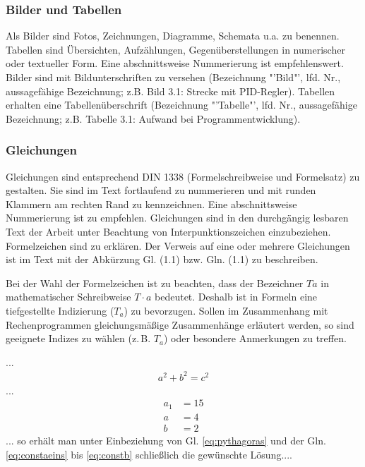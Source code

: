 \subsubsection{Bilder und Tabellen}
\label{sec:BilderUndTabellen}

Als Bilder sind Fotos, Zeichnungen, Diagramme, Schemata u.a. zu benennen. Tabellen sind Übersichten, Aufzählungen, Gegenüberstellungen in numerischer oder textueller Form. Eine abschnittsweise Nummerierung ist empfehlenswert.
Bilder sind mit Bildunterschriften zu versehen (Bezeichnung "'Bild"', lfd. Nr., aussagefähige Bezeichnung; z.B. Bild 3.1: Strecke mit PID-Regler).
Tabellen erhalten eine Tabellenüberschrift (Bezeichnung "'Tabelle"', lfd. Nr., aussagefähige Bezeichnung; z.B. Tabelle 3.1: Aufwand bei Programmentwicklung).


\subsubsection{Gleichungen}
\label{sec:Gleichungen}

Gleichungen sind entsprechend DIN 1338 (Formelschreibweise und Formelsatz) zu gestalten. Sie sind im Text fortlaufend zu nummerieren und mit runden Klammern am rechten Rand zu kennzeichnen. Eine abschnittsweise Nummerierung ist zu empfehlen. Gleichungen sind in den durchgängig lesbaren Text der Arbeit unter Beachtung von Interpunktionszeichen einzubeziehen. Formelzeichen sind zu erklären. Der Verweis auf eine oder mehrere Gleichungen ist im Text mit der Abkürzung Gl. (1.1) bzw. Gln. (1.1) zu beschreiben.

Bei der Wahl der Formelzeichen ist zu beachten, dass der Bezeichner $Ta$ in mathematischer Schreibweise $T \cdot a$ bedeutet. Deshalb ist in Formeln eine tiefgestellte Indizierung ($T_a$) zu bevorzugen. Sollen im Zusammenhang mit Rechenprogrammen gleichungsmäßige Zusammenhänge erläutert werden, so sind geeignete Indizes zu wählen (z.\,B. $T_a$) oder besondere Anmerkungen zu treffen.



...
\begin{align}
  a^2 + b^2 = c^2 \label{eq:pythagoras}
\end{align}
...
\begin{align}
  a_1 &= 15 \label{eq:constaeins} \\
  a   &= 4  \label{eq:consta} \\
  b   &= 2  \label{eq:constb}
\end{align}
... so erhält man unter Einbeziehung von Gl. \eqref{eq:pythagoras} und der Gln. \eqref{eq:constaeins} bis \eqref{eq:constb} schließlich die gewünschte Lösung....


